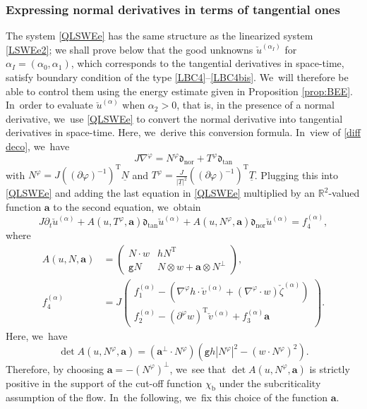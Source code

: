 \documentclass[JEP,XML,SOM,Unicode,NoFloatCountersInSection,published]{cedram}
\newcommand{\dtan}{{\mathfrak d}_\mathrm{tan}}
\newcommand{\dnor}{{\mathfrak d}_\mathrm{nor}}
\newcommand{\gr}{{\mathtt g}}
\newcommand{\R}{{\mathbb R}}
\newcommand{\dt}{\partial_t}
\newcommand{\ul}[1]{\underline{#1}}
\theoremstyle{definition}
\begin{document}
\subsubsection{Expressing normal derivatives in terms of tangential ones}
The system \eqref{QLSWEe} has the same structure as the linearized system \eqref{LSWEe2};
we shall prove below that the good unknowns $\check{u}^{(\alpha_I)}$ for $\alpha_I=(\alpha_0,\alpha_1)$,
which corresponds to the tangential derivatives in space-time, satisfy boundary condition of the type \eqref{LBC4}--\eqref{LBC4bis}. We~will therefore be able to control them using the energy estimate given in Proposition \ref{prop:BEE}. In~order to evaluate $\check{u}^{(\alpha)}$ when $\alpha_2>0$, that is, in the presence of a normal derivative, we~use \eqref{QLSWEe} to convert the normal derivative into tangential derivatives in space-time.
Here, we~derive this conversion formula. In~view of \eqref{diff deco}, we~have
\begin{equation}\label{diff deco2}
J\nabla^\varphi=N^\varphi\dnor+T^\varphi\dtan
\end{equation}
with $N^\varphi=J((\partial\varphi)^{-1})^\mathrm{T}\ul{N}$ and $T^\varphi=\frac{J}{|\ul{T}|^2}((\partial\varphi)^{-1})^\mathrm{T}\ul{T}$.
Plugging this into \eqref{QLSWEe} and adding the last equation in \eqref{QLSWEe} multiplied by an $\R^2$-valued function $\bm{a}$ to the second equation, we~obtain
\begin{equation}\label{QLSWEe2}
J\dt\check{u}^{(\alpha)}+A(u,T^\varphi,\bm{a})\dtan\check{u}^{(\alpha)}+A(u,N^\varphi,\bm{a})\dnor\check{u}^{(\alpha)}=f_4^{(\alpha)},
\end{equation}
where
\begin{align*}
A(u,N,\bm{a}) &=
\begin{pmatrix}
N\cdot w & hN^\mathrm{T} \\
\gr N & N\otimes w+\bm{a}\otimes N^\perp
\end{pmatrix}, \\
f_4^{(\alpha)} &= J
\begin{pmatrix}
f_1^{(\alpha)} - (\nabla^\varphi h\cdot\check{v}^{(\alpha)} + (\nabla^\varphi\cdot w)\check{\zeta}^{(\alpha)}) \\
f_2^{(\alpha)} - (\partial^\varphi w)^\mathrm{T}\check{v}^{(\alpha)} + f_3^{(\alpha)}\bm{a}
\end{pmatrix}.
\end{align*}
Here, we~have
\[
\det A(u,N^\varphi,\bm{a}) = (\bm{a}^\perp\cdot N^\varphi)(\gr h|N^\varphi|^2-(w\cdot N^\varphi)^2).
\]
Therefore, by choosing $\bm{a}=-(N^\varphi)^\perp$, we~see that $\det A(u,N^\varphi,\bm{a})$ is strictly positive
in the support of the cut-off function $\chi_\mathrm{b}$ under the subcriticality assumption of the flow. In~the following, we~fix this choice of the function $\bm{a}$.
\end{document}

